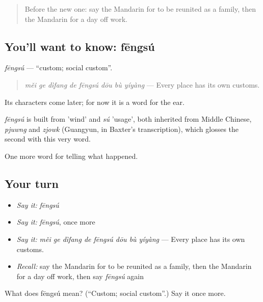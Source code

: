 \begin{quote}
Before the new one: say the Mandarin for to be reunited as a family, then the Mandarin for a day off work.
\end{quote}

\subsection*{You'll want to know: fēngsú}
\emph{fēngsú} — \textquotedblleft{}custom; social custom\textquotedblright{}.

\begin{quote}
\emph{měi ge dìfang de fēngsú dōu bù yíyàng} — Every place has its own customs.
\end{quote}

Its characters come later; for now it is a word for the ear.

\begin{cousinweb}
\emph{fēngsú} is built from  'wind' and \emph{sú} 'usage', both inherited from Middle Chinese, \emph{pjuwng} and \emph{zjowk} (Guangyun, in Baxter's transcription), which glosses the second with this very word.
\end{cousinweb}

\begin{grammarlens}[title={What you've built}]
One more word for telling what happened.
\end{grammarlens}

\subsection*{Your turn}
\begin{itemize}
\raggedright
  \item \emph{Say it:} \emph{fēngsú}
  \item \emph{Say it:} \emph{fēngsú}, once more
  \item \emph{Say it:} \emph{měi ge dìfang de fēngsú dōu bù yíyàng} — Every place has its own customs.
  \item \emph{Recall:} say the Mandarin for to be reunited as a family, then the Mandarin for a day off work, then say \emph{fēngsú} again
\end{itemize}

\begin{tcolorbox}[breakable,colback=teal!4,colframe=teal!35!black,title={Before you move on}]
What does fēngsú mean? (\textquotedblleft{}Custom; social custom\textquotedblright{}.) Say it once more.
\end{tcolorbox}
